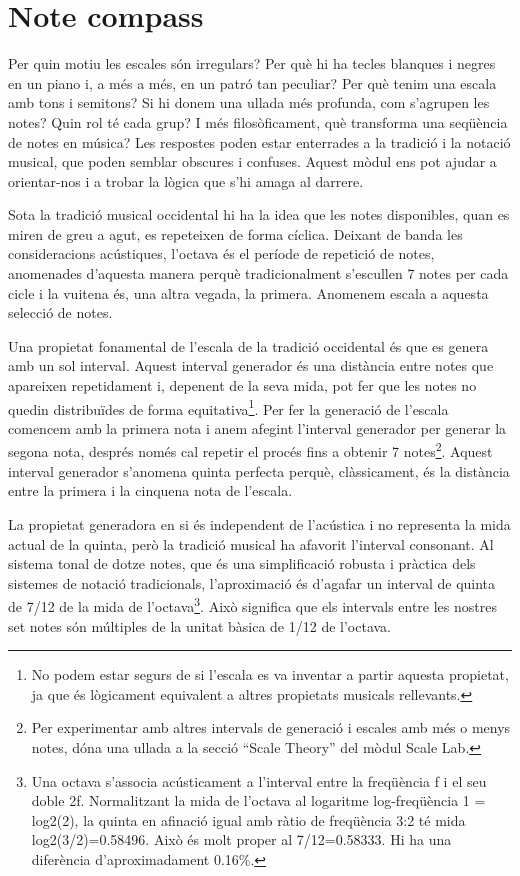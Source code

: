 \section{Note compass}
Per quin motiu les escales són irregulars? Per què hi ha tecles blanques i negres en un piano i, a més a més, en un patró tan peculiar? Per què tenim una escala amb tons i semitons? Si hi donem una ullada més profunda, com s'agrupen les notes? Quin rol té cada grup? I més filosòficament, què transforma una seqüència de notes en música? Les respostes poden estar enterrades a la tradició i la notació musical, que poden semblar obscures i confuses. Aquest mòdul ens pot ajudar a orientar-nos i a trobar la lògica que s'hi amaga al darrere.

Sota la tradició musical occidental hi ha la idea que les notes disponibles, quan es miren de greu a agut, es repeteixen de forma cíclica.  Deixant de banda les consideracions acústiques, l'octava és el període de repetició de notes, anomenades d'aquesta manera perquè tradicionalment s'escullen 7 notes per cada cicle i la vuitena és, una altra vegada, la primera. Anomenem escala a aquesta selecció  de notes.

Una propietat fonamental de l'escala de la tradició occidental és que es genera amb un sol interval. Aquest interval generador és una distància entre notes que apareixen repetidament i, depenent de la seva mida, pot fer que les notes no quedin distribuïdes de forma equitativa\footnote{No podem estar segurs de si l'escala es va inventar a partir aquesta propietat, ja que és lògicament equivalent a altres propietats musicals rellevants.}. Per fer la generació de l'escala comencem amb la primera nota i anem afegint l'interval generador per generar la segona nota, després només cal repetir el procés fins a obtenir 7 notes\footnote{Per experimentar amb altres intervals de generació i escales amb més o menys notes, dóna una ullada a la secció ``Scale Theory'' del mòdul Scale Lab.}. Aquest interval generador s'anomena quinta perfecta perquè, clàssicament, és la distància entre la primera i la cinquena nota de l'escala.

La propietat generadora en si és independent de l'acústica i no representa la mida actual de la quinta, però la tradició musical ha afavorit l'interval consonant. Al sistema tonal de dotze notes, que és una simplificació robusta i pràctica dels sistemes de notació tradicionals, l'aproximació és d'agafar un interval de quinta de 7/12 de la mida de l'octava\footnote{Una octava s'associa acústicament a l'interval entre la freqüència f i el seu doble 2f. Normalitzant la mida de l'octava al logaritme log-freqüència 1 = log2(2), la quinta en afinació igual amb ràtio de freqüència 3:2 té mida log2(3/2)=0.58496. Això és molt proper al 7/12=0.58333. Hi ha una diferència d'aproximadament 0.16\%.}. Això significa que els intervals entre les nostres set notes són múltiples de la unitat bàsica de 1/12 de l'octava.

